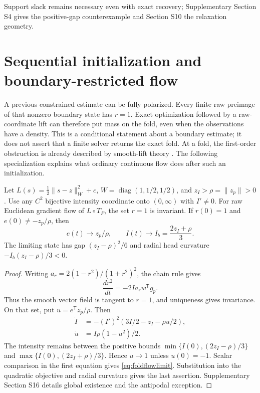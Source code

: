 Support slack remains necessary even with exact recovery; Supplementary Section S4 gives the positive-gap counterexample and Section S10 the relaxation geometry.





\section{Sequential initialization and boundary-restricted flow}
\label{sec:sequential}
A previous constrained estimate can be fully polarized. Every finite raw preimage of that nonzero boundary state has $r=1$. Exact optimization followed by a raw-coordinate lift can therefore put mass on the fold, even when the observations have a density. This is a conditional statement about a boundary estimate; it does not assert that a finite solver returns the exact fold. At a fold, the first-order obstruction is already described by smooth-lift theory \cite[Thm.~2.4]{lifts}. The following specialization explains what ordinary continuous flow does after such an initialization.

\begin{proposition}
\label{prop:restrictedflow}
Let $L(s)=\tfrac12\|s-z\|_W^2+c$, $W=\operatorname{diag}(1,1/2,1/2)$, and $z_I>\rho=\|z_p\|>0$. Use any $C^2$ bijective intensity coordinate onto $(0,\infty)$ with $I'\ne0$. For raw Euclidean gradient flow of $L\circ T_F$, the set $r=1$ is invariant. If $r(0)=1$ and $e(0)\ne-z_p/\rho$, then
\begin{equation}
 e(t)\longrightarrow z_p/\rho,\qquad
 I(t)\longrightarrow I_b=\frac{2z_I+\rho}{3}.
 \label{eq:foldflowlimit}
\end{equation}
The limiting state has gap $(z_I-\rho)^2/6$ and radial head curvature $-I_b(z_I-\rho)/3<0$.
\end{proposition}
\begin{proof}
Writing $a_r=2(1-r^2)/(1+r^2)^2$, the chain rule gives
\begin{equation}
 \frac{d r^2}{dt}=-2Ia_r w^{\mathsf T}g_p.
 \label{eq:radiusflow}
\end{equation}
Thus the smooth vector field is tangent to $r=1$, and uniqueness gives invariance. On that set, put $u=e^{\mathsf T}z_p/\rho$. Then
\begin{equation}
 \begin{aligned}
 \dot I&=-(I')^2(3I/2-z_I-\rho u/2),\\
 \dot u&=I\rho(1-u^2)/2.
 \end{aligned}
 \label{eq:restrictedflow}
\end{equation}
The intensity remains between the positive bounds $\min\{I(0),(2z_I-\rho)/3\}$ and $\max\{I(0),(2z_I+\rho)/3\}$. Hence $u\to1$ unless $u(0)=-1$. Scalar comparison in the first equation gives \eqref{eq:foldflowlimit}. Substitution into the quadratic objective and radial curvature gives the last assertion. Supplementary Section S16 details global existence and the antipodal exception.
\end{proof}

